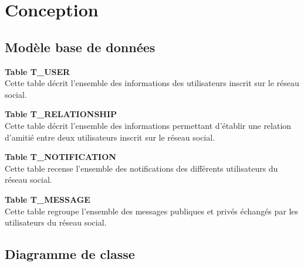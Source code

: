 \documentclass[12pt,a4paper,titlepage]{article}
\begin{document}
\clearpage{\pagestyle{empty}}



\section{Conception}

\subsection{Modèle base de données}

\textbf{Table T\_USER}\\
Cette table décrit l'ensemble des informations des utilisateurs inscrit sur le 
réseau social.\\
\newline

\textbf{Table T\_RELATIONSHIP}\\
Cette table décrit l'ensemble des informations permettant d'établir une relation 
d'amitié entre deux utilisateurs inscrit sur le réseau social.\\
\newline

\textbf{Table T\_NOTIFICATION}\\
Cette table recense l'ensemble des notifications des différents utilisateurs du réseau 
social.\\
\newline

\textbf{Table T\_MESSAGE}\\
Cette table regroupe l'ensemble des messages publiques et privés échangés par les 
utilisateurs du réseau social.\\






\clearpage{\pagestyle{empty}}



\subsection{Diagramme de classe}
\end{document}
